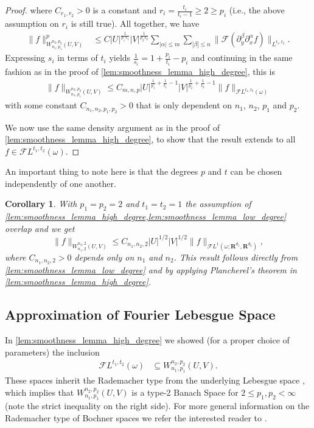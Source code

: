 \documentclass[a4paper]{article}
\newcommand{\rr}[1]{\mathbf{R}^{#1}}
\newcommand{\rrI}{\rr{d_1}}
\newcommand{\rrII}{\rr{d_2}}
\newcommand{\norm}[2]{\|#1\|_{#2}}
\newcommand{\F}[0]{\mathscr{F}}
\newcommand{\FL}[1]{\F L^{#1}}
\numberwithin{equation}{section}
\newtheorem{corollary}[theorem]{Corollary}
\theoremstyle{remark}
\begin{document}
\begin{proof}
    where \(C_{r_1,r_2}>0\) is a constant and \(r_i=\frac{t_i}{t_i-1}\geq 2\geq p_i\) (i.e., the above assumption on \(r_i\) is still true).
    All together, we have
    \begin{align*}
        \norm{f}{W_{n_1,p_1}^{n_2, p_2}(U, V)}^p
        &\leq C|U|^{\frac{1}{p_1s_1}}|V|^{\frac{1}{p_2s_2}}\sum_{|\alpha|\leq m}\sum_{|\beta|\leq n}\norm{\mathscr{F}\left(\partial_y^\beta\partial_x^\alpha f\right)}{L^{t_1,t_2}}.
    \end{align*}
    Expressing \(s_i\) in terms of \(t_i\) yields \(\frac{1}{s_i}=1+\frac{p_i}{t_i}-p_i\) and continuing in the same fashion as in the proof of \cref{lem:smoothness_lemma_high_degree}, this is
    \begin{align*}
        \norm{f}{W_{n_1,p_1}^{n_2, p_2}(U, V)}
        \leq C_{m,n,p}|U|^{\frac{1}{p_1}+\frac{1}{t_1}-1}|V|^{\frac{1}{p_2}+\frac{1}{t_2}-1}\norm{f}{\mathscr{F}L^{t_1,t_2}(\omega)}
    \end{align*}
    with some constant \(C_{n_1,n_2,p_1,p_2}>0\) that is only dependent on $n_1$, $n_2$, $p_1$ and $p_2$.

    We now use the same density argument as in the proof of \cref{lem:smoothness_lemma_high_degree}, to show that the result extends to all $f\in\FL{t_1,t_2}(\omega)$.
\end{proof}
An important thing to note here is that the degrees \(p\) and \(t\) can be chosen independently of one another.

\begin{corollary}
    With \(p_1=p_2=2\) and \(t_1=t_2=1\) the assumption of \cref{lem:smoothness_lemma_high_degree,lem:smoothness_lemma_low_degree} overlap and we get
    \begin{equation*}
    	\norm{f}{W_{n_1,2}^{n_2, 2}(U, V)}
            \leq 
        C_{n_1,n_2,2}
        |U|^{1/2}
        |V|^{1/2}
        \norm{f}{\mathcal{F}L^1(\omega;\rrI, \rrII)},
	\end{equation*}
    where $C_{n_1,n_2, 2}>0$ depends only on $n_1$ and $n_2$.
    This result follows directly from \cref{lem:smoothness_lemma_low_degree} and by applying Plancherel's theorem in \cref{lem:smoothness_lemma_high_degree}.
\end{corollary}

\subsection{Approximation of Fourier Lebesgue Space}
\label{sec:approximation_of_FL}
In \cref{lem:smoothness_lemma_high_degree} we showed
(for a proper choice of parameters) 
the inclusion
\begin{align*}
    \mathscr{F}L^{t_1,t_2}(\omega)
    &\subseteq
    W_{n_1,p_1}^{n_2,p_2}(U,V).
\end{align*}
These spaces inherit the Rademacher type from the underlying Lebesgue space \cite{Pelczynski86IsomorphismsAnisotropicSobolev,Hytonen17AnalysisBanachSpacesII},
which implies that $W_{n_1,p_1}^{n_2,p_2}(U,V)$ is a type-2 Banach Space for
\(2\leq p_1,p_2< \infty\) (note the strict inequality on the right side).
For more general information on the Rademacher type of Bochner spaces we refer the interested reader to \cite{Hytonen17AnalysisBanachSpacesII}.
\end{document}
